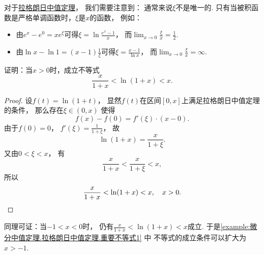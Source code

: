 \begin{remark}
对于\hyperref[theorem:微分中值定理.拉格朗日中值定理]{拉格朗日中值定理}，
我们需要注意到：
通常来说\(\xi\)不是唯一的.
只有当被积函数是严格单调函数时，\(\xi\)是\(x\)的函数，
例如：\begin{itemize}
	\item 由\(e^x - e^0 = x e^\xi\)可得\(\xi = \ln\frac{e^x-1}{x}\)，
	而\(\lim_{x\to0} \frac{\xi}{x} = \frac12\).
	\item 由\(\ln x - \ln1 = (x-1) \frac1\xi\)可得\(\xi = \frac{x-1}{\ln x}\)，
	而\(\lim_{x\to0} \frac{\xi}{x} = \infty\).
\end{itemize}
\end{remark}

\begin{example}\label{example:微分中值定理.拉格朗日中值定理.重要不等式1}
证明：当\(x>0\)时，成立不等式\[
	\frac{x}{1+x} < \ln(1+x) < x.
\]
\begin{proof}
设\(f(t) = \ln(1+t)\)，
显然\(f(t)\)在区间\([0,x]\)上满足拉格朗日中值定理的条件，
那么存在\(\xi\in(0,x)\)
使得\[
	f(x)-f(0)=f'(\xi)\cdot(x-0).
\]
由于\(f(0)=0\)，
\(f'(\xi)=\frac1{1+\xi}\)，
故\[
	\ln(1+x) = \frac{x}{1+\xi}.
\]
又由\(0<\xi<x\)，
有\[
	\frac{x}{1+x}<\frac{x}{1+\xi}<x,
\]
所以\[
	\frac{x}{1+x}<\ln(1+x)<x, \quad x > 0.
	\qedhere
\]
\end{proof}
\end{example}
\begin{remark}
同理可证：当\(-1<x<0\)时，
仍有\(\frac{x}{1+x}<\ln(1+x)<x\)成立.
于是\cref{example:微分中值定理.拉格朗日中值定理.重要不等式1} 中
不等式的成立条件可以扩大为\(x>-1\).
\end{remark}

